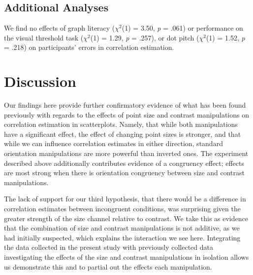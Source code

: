 \documentclass[manuscript, review, anonymous, screen]{acmart}
\begin{document}
\hypertarget{sec-add-analyses}{%
\subsection{Additional Analyses}\label{sec-add-analyses}}

We find no effects of graph literacy (\(\chi^2\)(1) = 3.50, \emph{p} =
.061) or performance on the visual threshold task (\(\chi^2\)(1) = 1.29,
\emph{p} = .257), or dot pitch (\(\chi^2\)(1) = 1.52, \emph{p} = .218)
on participants' errors in correlation estimation.

\hypertarget{sec-discussion}{%
\section{Discussion}\label{sec-discussion}}

Our findings here provide further confirmatory evidence of what has been
found previously with regards to the effects of point size and contrast
manipulations on correlation estimation in scatterplots. Namely, that
while both manipulations have a significant effect, the effect of
changing point sizes is stronger, and that while we can influence
correlation estimates in either direction, standard orientation
manipulations are more powerful than inverted ones. The experiment
described above additionally contributes evidence of a congruency
effect; effects are most strong when there is orientation congruency
between size and contrast manipulations.

The lack of support for our third hypothesis, that there would be a
difference in correlation estimates between incongruent conditions, was
surprising given the greater strength of the size channel relative to
contrast. We take this as evidence that the combination of size and
contrast manipulations is not additive, as we had initially suspected,
which explains the interaction we see here. Integrating the data
collected in the present study with previously collected data
investigating the effects of the size and contrast manipulations in
isolation allows us demonstrate this and to partial out the effects each
manipulation.
\end{document}

